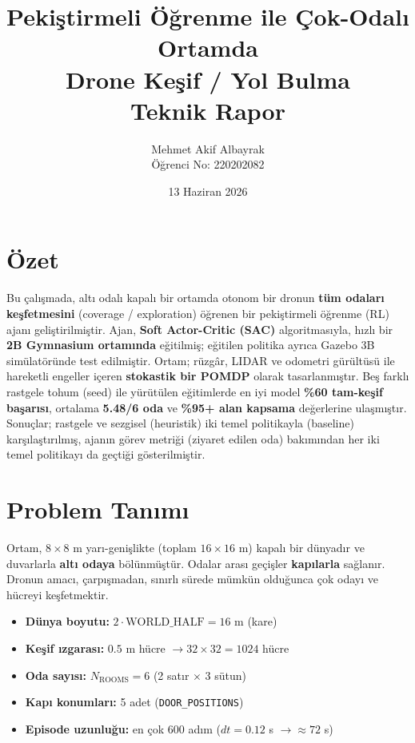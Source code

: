 \documentclass[11pt,a4paper]{article}
\title{\textbf{Pekiştirmeli Öğrenme ile Çok-Odalı Ortamda\\
Drone Keşif / Yol Bulma}\\[4pt]
\large Teknik Rapor}
\author{Mehmet Akif Albayrak \\ Öğrenci No: 220202082}
\date{13 Haziran 2026}
\begin{document}
\maketitle

\section{Özet}
Bu çalışmada, altı odalı kapalı bir ortamda otonom bir dronun \textbf{tüm
odaları keşfetmesini} (coverage / exploration) öğrenen bir pekiştirmeli öğrenme
(RL) ajanı geliştirilmiştir. Ajan, \textbf{Soft Actor-Critic (SAC)}
algoritmasıyla, hızlı bir \textbf{2B Gymnasium ortamında} eğitilmiş; eğitilen
politika ayrıca Gazebo 3B simülatöründe test edilmiştir. Ortam; rüzgâr, LIDAR
ve odometri gürültüsü ile hareketli engeller içeren \textbf{stokastik bir POMDP}
olarak tasarlanmıştır. Beş farklı rastgele tohum (seed) ile yürütülen
eğitimlerde en iyi model \textbf{\%60 tam-keşif başarısı}, ortalama
\textbf{5.48/6 oda} ve \textbf{\%95+ alan kapsama} değerlerine ulaşmıştır.
Sonuçlar; rastgele ve sezgisel (heuristik) iki temel politikayla (baseline)
karşılaştırılmış, ajanın görev metriği (ziyaret edilen oda) bakımından her iki
temel politikayı da geçtiği gösterilmiştir.

\section{Problem Tanımı}
Ortam, $8\times 8$ m yarı-genişlikte (toplam $16\times 16$ m) kapalı bir
dünyadır ve duvarlarla \textbf{altı odaya} bölünmüştür. Odalar arası geçişler
\textbf{kapılarla} sağlanır. Dronun amacı, çarpışmadan, sınırlı sürede mümkün
olduğunca çok odayı ve hücreyi keşfetmektir.

\begin{itemize}[noitemsep]
  \item \textbf{Dünya boyutu:} $2\cdot\text{WORLD\_HALF}=16$ m (kare)
  \item \textbf{Keşif ızgarası:} $0.5$ m hücre $\rightarrow 32\times 32 = 1024$ hücre
  \item \textbf{Oda sayısı:} $N_{\text{ROOMS}}=6$ (2 satır $\times$ 3 sütun)
  \item \textbf{Kapı konumları:} 5 adet (\texttt{DOOR\_POSITIONS})
  \item \textbf{Episode uzunluğu:} en çok $600$ adım ($dt=0.12$ s $\rightarrow \approx 72$ s)
\end{itemize}
\end{document}
